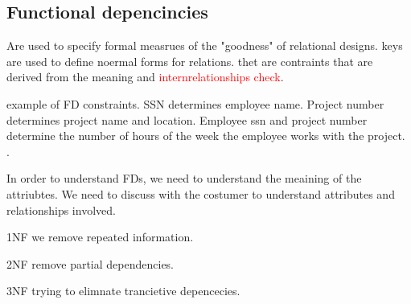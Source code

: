 \subsection*{Functional depencincies}
Are used to specify formal measrues of the "goodness" of relational designs. keys are used to define noermal forms for relations. thet are contraints that are derived from the meaning and \textcolor{red}{internrelationships check}. 

example of FD constraints. SSN determines employee name. Project number determines project name and location. Employee ssn and project number determine the number of hours of the week the employee works with the project. .

In order to understand FDs, we need to understand the meaining of the attriubtes. We need to discuss with the costumer to understand attributes and relationships involved. 

1NF we remove repeated information.

2NF remove partial dependencies. 

3NF trying to elimnate trancietive depencecies. 





